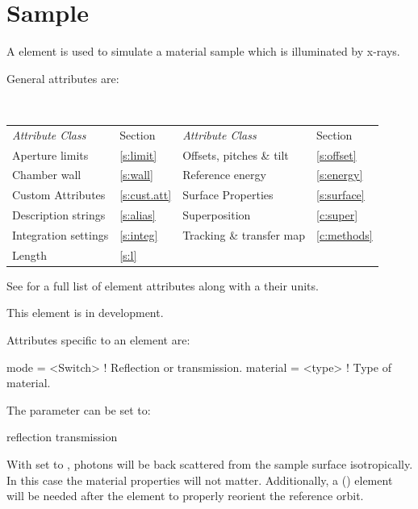 {\newpage

\section{Sample}
\label{s:sample}

A  element is used to simulate a material sample which is illuminated by x-rays.

General  attributes are:
\begin{center}
\tt
\begin{tabular}{llll} \toprule
  {\sl Attribute Class}      & Section           & {\sl Attribute Class}      & Section         \\
  Aperture limits            & \ref{s:limit}     & Offsets, pitches \& tilt   & \ref{s:offset}  \\ \midrule
  Chamber wall               & \ref{s:wall}      & Reference energy           & \ref{s:energy}  \\ 
  Custom Attributes          & \ref{s:cust.att}  & Surface Properties         & \ref{s:surface} \\
  Description strings        & \ref{s:alias}     & Superposition              & \ref{c:super}   \\
  Integration settings       & \ref{s:integ}     & Tracking \& transfer map   & \ref{c:methods} \\
  Length                     & \ref{s:l}         &                            &                 \\
  \bottomrule
\end{tabular}
\end{center}
\toffset
See  for a full list of element attributes along with a their units.

This element is in development.

Attributes specific to an  element are:
\begin{example}
  mode       = <Switch> ! Reflection or transmission.
  material   = <type>   ! Type of material. 
\end{example}

The  parameter can be set to:
\begin{example}
  reflection
  transmission
\end{example}
With  set to , photons will be back scattered
from the sample surface isotropically. In this case the material
properties will not matter. Additionally, a 
() element will be needed after the  element
to properly reorient the reference orbit.

}
